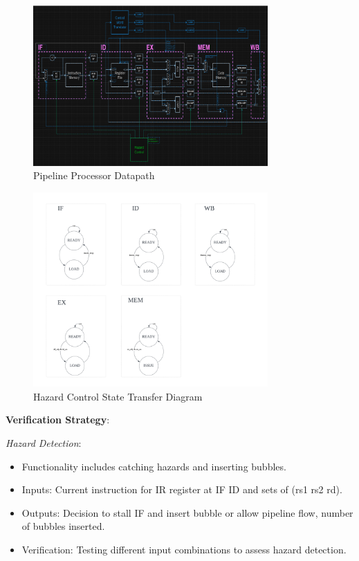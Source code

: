 \documentclass[12pt, a4paper]{article}
\begin{document}
    
    \begin{figure}[H]
        \centering
        \includegraphics[width=0.8\textwidth]{pipeline_datapath.png}
        \caption{Pipeline Processor Datapath}
        \label{fig:enter-label}
    \end{figure}

    \begin{figure}[H]
        \centering
        \includegraphics[width=0.8\textwidth]{state_transfer.png}
        \caption{Hazard Control State Transfer Diagram}
        \label{fig:enter-label}
    \end{figure}

    \textbf{Verification Strategy}: 

    \textit{Hazard Detection}:
    \begin{itemize}
        \item Functionality includes catching hazards and inserting bubbles.
        \item Inputs: Current instruction for IR register at IF ID and sets of (rs1 rs2 rd).
        \item Outputs: Decision to stall IF and insert bubble or allow pipeline flow, number of bubbles inserted.
        \item Verification: Testing different input combinations to assess hazard detection.
    \end{itemize}
    
\end{document}
